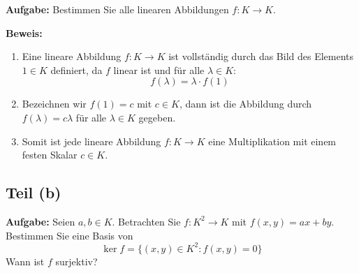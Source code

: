 \documentclass[11pt]{article}
\begin{document}
\textbf{Aufgabe:} Bestimmen Sie alle linearen Abbildungen \( f: K \to K \).

\textbf{Beweis:}
\begin{enumerate}
    \item Eine lineare Abbildung \( f: K \to K \) ist vollständig durch das Bild des Elements \( 1 \in K \) definiert, da \( f \) linear ist und für alle \( \lambda \in K \):
    \[
    f(\lambda) = \lambda \cdot f(1)
    \]
    \item Bezeichnen wir \( f(1) = c \) mit \( c \in K \), dann ist die Abbildung durch \( f(\lambda) = c \lambda \) für alle \( \lambda \in K \) gegeben.
    \item Somit ist jede lineare Abbildung \( f: K \to K \) eine Multiplikation mit einem festen Skalar \( c \in K \).
\end{enumerate}

\subsection*{Teil (b)}

\textbf{Aufgabe:} Seien \( a, b \in K \). Betrachten Sie \( f: K^2 \to K \) mit \( f(x, y) = ax + by \). Bestimmen Sie eine Basis von
\[
\ker f = \{(x, y) \in K^2 : f(x, y) = 0\}
\]
Wann ist \( f \) surjektiv?
\end{document}

